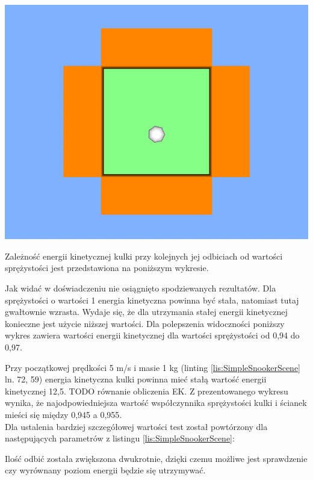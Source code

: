 \includegraphics[width=\textwidth]{./img/SimpleSnookerScene.png}

Zależność energii kinetycznej kulki przy kolejnych jej odbiciach od wartości
sprężystości jest przedstawiona na poniższym wykresie.



Jak widać w doświadczeniu nie osiągnięto spodziewanych rezultatów. Dla
sprężystości o wartości 1 energia kinetyczna powinna być stała, natomiast tutaj
gwałtownie wzrasta. Wydaje się, że dla utrzymania stałej energii kinetycznej
konieczne jest użycie niższej wartości. Dla polepszenia widoczności poniższy
wykres zawiera wartości energii kinetycznej dla wartości sprężystości od 0,94 do
0,97.



Przy początkowej prędkości 5 m/s i masie 1 kg (linting
\ref{lis:SimpleSnookerScene} ln. 72, 59) energia kinetyczna kulki powinna mieć
stałą wartość energii kinetycznej 12,5.
TODO równanie obliczenia EK.
Z prezentowanego wykresu wynika, że najodpowiedniejsza wartość współczynnika
sprężystości kulki i ścianek mieści się między 0,945 a 0,955.\\
Dla ustalenia bardziej szczegółowej wartości test został powtórzony dla
następujących parametrów z listingu \ref{lis:SimpleSnookerScene}:


  
Ilość odbić została zwiększona dwukrotnie, dzięki czemu możliwe jest sprawdzenie
czy wyrównany poziom energii będzie się utrzymywać.
  
